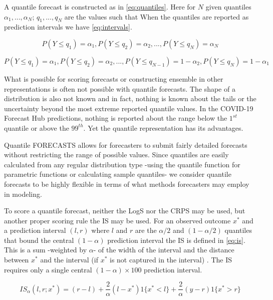 \documentclass[11pt,notitlepage]{isuthesis}
\begin{document}
A quantile forecast is constructed as in \eqref{eq:quantiles}.
Here for $N$ given quantiles $\alpha_1,..., \alpha_N$; $q_1,..., q_N$ are the 
values such that 
When the quantiles are reported as prediction intervals we have 
\eqref{eq:intervals}.

\begin{equation}
\label{eq:quantiles}
  P(Y \leq q_1) = \alpha_1, P(Y \leq q_2) = \alpha_2, ..., 
  P(Y \leq q_N) = \alpha_N
\end{equation}


\begin{equation}
\label{eq:intervals}
  P(Y \leq q_1) = \alpha_1, P(Y \leq q_2) = \alpha_2, ...,
  P(Y \leq q_{N-1}) = 1 - \alpha_2, P(Y \leq q_N) = 1 - \alpha_1
\end{equation}

What is possible for scoring forecasts
or constructing ensemble in other representations is often not possible with
quantile forecasts. The shape of a distribution is also not known and in fact,
nothing is known about the tails or the uncertainty beyond the most 
extreme reported quantile values. In the COVID-19 Forecast Hub predictions, 
nothing 
is reported about the range below the $1^{st}$ quantile or above the $99^{th}$.
Yet the quantile representation has its advantages. 

Quantile FORECASTS allows for forecasters to submit fairly detailed
forecasts without restricting the range of possible values.
Since quantiles are easily calculated from any regular distribution type
-using the quantile function for parametric functions or calculating sample 
quantiles- we consider quantile forecasts to be highly flexible in terms of 
what methods forecasters may employ in modeling.

To score a quantile forecast, 
neither the LogS nor the CRPS may be used, 
but another proper scoring rule the IS may be used.
For an observed outcome $x^*$ and a prediction interval $(l,r)$ 
where $l$ and $r$ are the $\alpha/2$ and $(1-\alpha/2)$ quantiles that bound
the central $(1-\alpha)$ prediction interval the IS is defined in \eqref{eq:is}.
This is a sum -weighted by 
$\alpha$- of the width of the
interval and the distance between $x^*$ and the interval (if $x^*$ is not 
captured in the interval) \cite{gneiting2014probabilistic}. 
The IS requires only a single central 
$(1-\alpha) \times 100$ prediction interval.

\begin{equation}
\label{eq:is}
  IS_{\alpha}(l,r; x^*) = (r-l) + \frac{2}{\alpha}(l-x^*)1\{x^*<l\} 
  + \frac{2}{\alpha}(y-r)1\{x^* > r\}
\end{equation}
\end{document}
